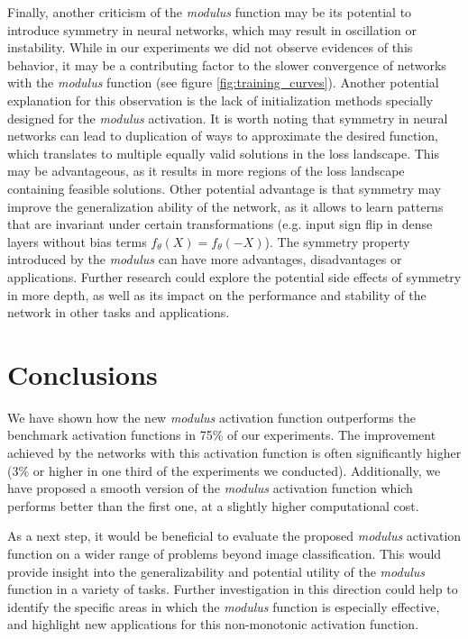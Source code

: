 \documentclass[authoryear]{elsarticle}
\begin{document}
Finally, another  criticism of the \textit{modulus} function may be its potential to introduce symmetry in neural networks, which may result in oscillation or instability. While in our experiments we did not observe evidences of this behavior, it may be a contributing factor to the slower convergence of networks with the \textit{modulus} function (see figure \ref{fig:training_curves}). Another potential explanation for this observation is the lack of initialization methods specially designed for the \textit{modulus} activation. It is worth noting that symmetry in neural networks can lead to duplication of ways to approximate the desired function, which translates to multiple equally valid solutions in the loss landscape. This may be advantageous, as it results in more regions of the loss landscape containing feasible solutions. Other potential advantage is that symmetry may improve the generalization ability of the network, as it allows to learn patterns that are invariant under certain transformations (e.g. input sign flip in dense layers without bias terms $f_\theta(X) = f_\theta(-X)$). The symmetry property introduced by the \textit{modulus} can have more advantages, disadvantages or applications. Further research could explore the potential side effects of symmetry in more depth, as well as its impact on the performance and stability of the network in other tasks and applications.


\section{Conclusions} \label{sec:conclusions}
We have shown how the new \textit{modulus} activation function outperforms the benchmark activation functions in 75\% of our experiments. The improvement achieved by the networks with this activation function is often significantly higher ($3\%$ or higher in one third of the experiments we conducted). Additionally, we have proposed a smooth version of the \textit{modulus} activation function which performs better than the first one, at a slightly higher computational cost. 

As a next step, it would be beneficial to evaluate the proposed \textit{modulus} activation function on a wider range of problems beyond image classification. This would provide insight into the generalizability and potential utility of the \textit{modulus} function in a variety of tasks. Further investigation in this direction could help to identify the specific areas in which the \textit{modulus} function is especially effective, and highlight new applications for this non-monotonic activation function.
\end{document}
